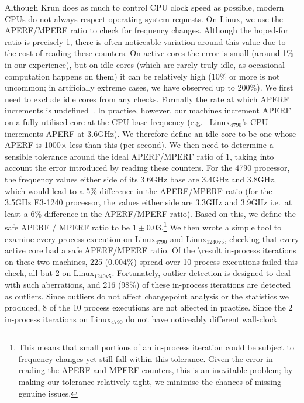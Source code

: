 \documentclass[acmsmall,screen]{acmart}
\newcommand{\krun}{Krun\xspace}
\newcommand{\bencherfive}{Linux$_\mathrm{4790}$\xspace}
\newcommand{\bencherseven}{Linux$_\mathrm{1240v5}$\xspace}
\begin{document}
Although \krun does as much to control CPU clock speed as possible, modern CPUs
do not always respect operating system requests. On Linux, we use the
APERF/MPERF ratio to check for frequency changes. Although the hoped-for
ratio is precisely 1, there is often noticeable variation around this value due to the
cost of reading these counters. On active cores the error is small (around 1\% in our
experience), but on idle cores (which are rarely truly idle, as occasional
computation happens on them) it can be relatively high (10\% or more is
not uncommon; in artificially extreme cases, we have observed up to 200\%).
We first need to exclude idle cores from any checks. Formally
the rate at which APERF increments is undefined~\cite{intel17pstate}. In
practise, however, our machines increment APERF on a fully utilised core at the CPU base frequency
(e.g.~ \bencherfive's CPU increments APERF at $3.6$GHz).
We therefore define an idle core to be one whose APERF is 1000$\times$ less than this (per
second). We then need to determine a sensible tolerance around the ideal APERF/MPERF ratio of 1,
taking into account the error introduced by reading these counters.
For the 4790 processor, the frequency values either side of its 3.6GHz base
are 3.4GHz and 3.8GHz, which would lead to a 5\% difference in the APERF/MPERF
ratio (for the 3.5GHz E3-1240 processor, the values either side are 3.3GHz and 3.9GHz i.e.~at
least a 6\% difference in the APERF/MPERF ratio). Based on this, we define the
safe APERF / MPERF ratio to be $1\pm0.03$.\footnote{This means that small
portions of an in-process iteration could be subject to frequency changes yet still fall within
this tolerance. Given the error in reading the APERF and MPERF counters, this is an
inevitable problem; by making our tolerance relatively tight, we minimise the
chances of missing genuine issues.} We then wrote a simple tool to examine
every process execution on \bencherfive and \bencherseven, checking that every
%
active core had a safe APERF/MPERF ratio. Of the \num{\result}\xspace in-process iterations
on these two machines, 225 (0.004\%) spread over 10 process executions failed
this check, all but 2 on \bencherseven. Fortunately, outlier detection is designed
to deal with such aberrations, and 216 (98\%) of these in-process iterations are
detected as outliers. Since outliers do not affect changepoint analysis or
the statistics we produced, 8 of the 10 process executions are not affected in practise.
Since the 2 in-process iterations on \bencherfive do not have noticeably different wall-clock
\end{document}
